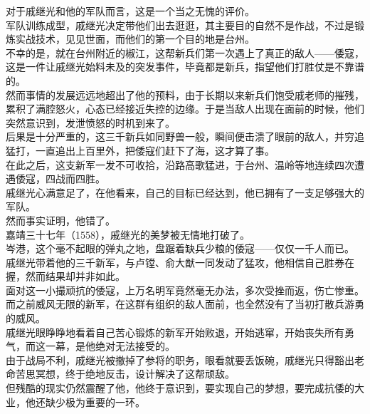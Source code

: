 \begin{multicols}{\theparacolNo}
对于戚继光和他的军队而言，这是一个当之无愧的评价。\\

军队训练成型，戚继光决定带他们出去逛逛，其主要目的自然不是作战，不过是锻炼实战技术，见见世面，而他们的第一个目的地是台州。\\

不幸的是，就在台州附近的椒江，这帮新兵们第一次遇上了真正的敌人——倭寇，这是一件让戚继光始料未及的突发事件，毕竟都是新兵，指望他们打胜仗是不靠谱的。\\

然而事情的发展远远地超出了他的预料，由于长期以来新兵们饱受戚老师的摧残，累积了满腔怒火，心态已经接近失控的边缘。于是当敌人出现在面前的时候，他们突然意识到，发泄愤怒的时机到来了。\\

后果是十分严重的，这三千新兵如同野兽一般，瞬间便击溃了眼前的敌人，并穷追猛打，一直追出上百里外，把倭寇们赶下了海，这才算了事。\\

在此之后，这支新军一发不可收拾，沿路高歌猛进，于台州、温岭等地连续四次遭遇倭寇，四战而四胜。\\

戚继光心满意足了，在他看来，自己的目标已经达到，他已拥有了一支足够强大的军队。\\

然而事实证明，他错了。\\

嘉靖三十七年（1558），戚继光的美梦被无情地打破了。\\

岑港，这个毫不起眼的弹丸之地，盘踞着缺兵少粮的倭寇——仅仅一千人而已。\\

戚继光带着他的三千新军，与卢镗、俞大猷一同发动了猛攻，他相信自己胜券在握，然而结果却并非如此。\\

面对这一小撮顽抗的倭寇，上万名明军竟然毫无办法，多次受挫而返，伤亡惨重。而之前威风无限的新军，在这群有组织的敌人面前，也全然没有了当初打散兵游勇的威风。\\

戚继光眼睁睁地看着自己苦心锻炼的新军开始败退，开始逃窜，开始丧失所有勇气，而这一幕，是他绝对无法接受的。\\

由于战局不利，戚继光被撤掉了参将的职务，眼看就要丢饭碗，戚继光只得豁出老命苦思冥想，终于绝地反击，设计解决了这帮顽敌。\\

但残酷的现实仍然震醒了他，他终于意识到，要实现自己的梦想，要完成抗倭的大业，他还缺少极为重要的一环。\\


\end{multicols}
